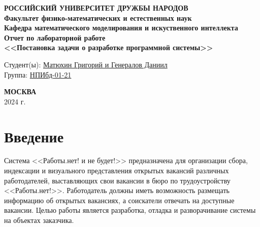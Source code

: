 \documentclass[a4page]{article}
\begin{document}

\begin{titlepage}

\begin{center}
\hfill \break
\textbf{
\large{РОССИЙСКИЙ УНИВЕРСИТЕТ ДРУЖБЫ НАРОДОВ}\\
\normalsize{Факультет физико-математических и естественных наук}\\ 
\normalsize{Кафедра математического моделирования и искуственного интеллекта}\\
}
\vspace*{\fill}
\Large{\textbf{Отчет по лабораторной работе  \\ \Large<<Постановка задачи о разработке программной системы>>}}
\vspace*{\fill}

\end{center}
 
 \begin{flushright}
 Студент(ы): \underline{Матюхин Григорий и Генералов Даниил}\\ \vspace{0.5cm}
 Группа: \underline{НПИбд-01-21}
 \end{flushright}
 
 
\begin{center} \textbf{МОСКВА} \\ 2024 г. \end{center}
\thispagestyle{empty} %

\end{titlepage}

\newpage

\tableofcontents

\newpage

\section{Введение}

Система <<Работы.нет! и не будет!>> предназначена для организации сбора, индексации и визуального представления открытых вакансий различных работодателей, выставляющих свои вакансии в бюро по трудоустройству <<Работы.нет!>>. Работодатель должны иметь возможность размещать информацию об открытых вакансиях, а соискатели отвечать на доступные вакансии.
Целью работы является разработка, отладка и разворачивание системы на объектах заказчика.
\end{document}
